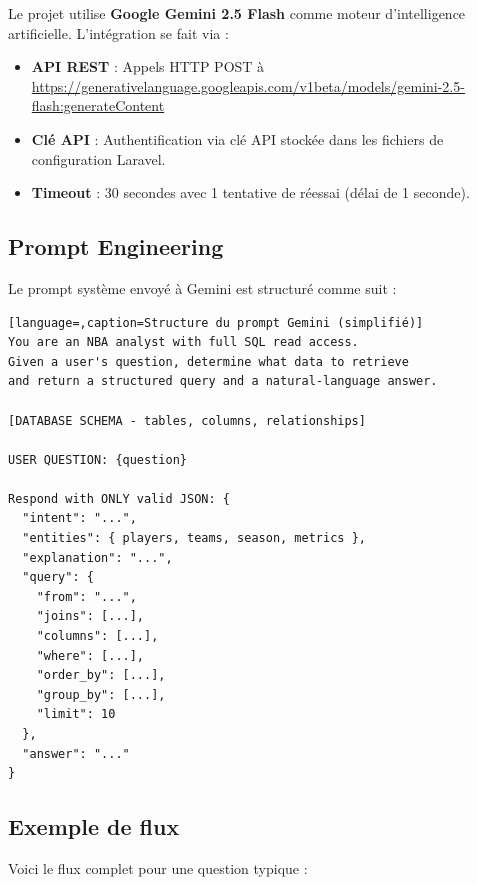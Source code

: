\documentclass[12pt,a4paper]{report}
\begin{document}
Le projet utilise \textbf{Google Gemini 2.5 Flash} comme moteur d'intelligence artificielle. L'intégration se fait via :

\begin{itemize}
    \item \textbf{API REST} : Appels HTTP POST à \url{https://generativelanguage.googleapis.com/v1beta/models/gemini-2.5-flash:generateContent}
    \item \textbf{Clé API} : Authentification via clé API stockée dans les fichiers de configuration Laravel.
    \item \textbf{Timeout} : 30 secondes avec 1 tentative de réessai (délai de 1 seconde).
\end{itemize}

\subsection{Prompt Engineering}

Le prompt système envoyé à Gemini est structuré comme suit :

\begin{lstlisting}[language=,caption=Structure du prompt Gemini (simplifié)]
You are an NBA analyst with full SQL read access.
Given a user's question, determine what data to retrieve
and return a structured query and a natural-language answer.

[DATABASE SCHEMA - tables, columns, relationships]

USER QUESTION: {question}

Respond with ONLY valid JSON: {
  "intent": "...",
  "entities": { players, teams, season, metrics },
  "explanation": "...",
  "query": {
    "from": "...",
    "joins": [...],
    "columns": [...],
    "where": [...],
    "order_by": [...],
    "group_by": [...],
    "limit": 10
  },
  "answer": "..."
}
\end{lstlisting}

\subsection{Exemple de flux}

Voici le flux complet pour une question typique :
\end{document}
